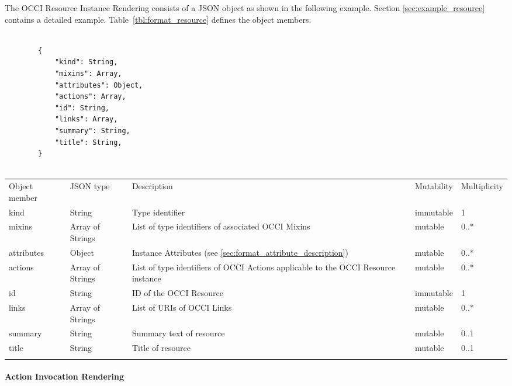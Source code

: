 \documentclass[10pt,a4paper]{article}
\begin{document}
The OCCI Resource Instance Rendering consists of a JSON object as shown in the
following example. Section \ref{sec:example_resource} contains a detailed
example.
Table~\ref{tbl:format_resource} defines the object members.
\begin{lstlisting}

        {
            "kind": String,
            "mixins": Array,
            "attributes": Object,
            "actions": Array,
            "id": String,
            "links": Array,
            "summary": String,
            "title": String,
        }


\end{lstlisting}
 {
    \begin{tabularx}{\textwidth}{llXll}
    \toprule
    Object member & JSON type & Description & Mutability & Multiplicity \\
    \colrule
    kind & String & Type identifier & immutable & 1 \\

    mixins & Array of Strings & List of type identifiers of associated OCCI
Mixins  &
mutable & 0..* \\

    attributes & Object & Instance Attributes (see
\ref{sec:format_attribute_description}) & mutable & 0..* \\
    
    actions & Array of Strings & List of type identifiers of OCCI
Actions applicable to the OCCI Resource instance & mutable & 0..* \\
    
    id & String & ID of the OCCI Resource & immutable & 1\\
            
    links & Array of Strings & List of URIs of OCCI Links & mutable & 0..*\\
    summary & String & Summary text of resource & mutable & 0..1 \\
    title & String & Title of resource & mutable & 0..1 \\
    \botrule
    \end{tabularx}
}

\paragraph{Action Invocation Rendering}
\label{sec:format_action_invocation}
\end{document}
